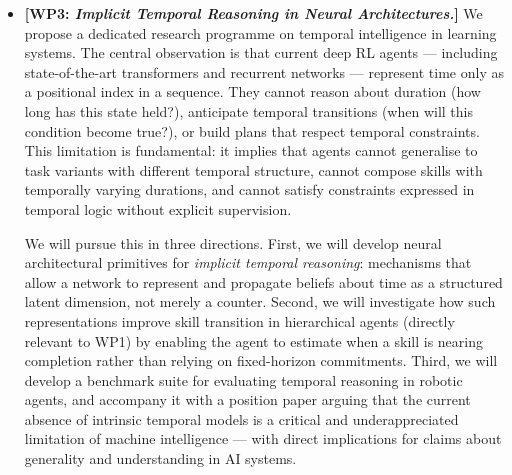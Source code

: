 \documentclass[11pt,a4paper]{article}
\begin{document}
\begin{itemize}[leftmargin=1.5em, itemsep=6pt]
\item \textbf{[WP3: \textit{Implicit Temporal Reasoning in Neural Architectures.}]}
  We propose a dedicated research programme on temporal intelligence in learning systems.
  The central observation is that current deep RL agents --- including state-of-the-art
  transformers and recurrent networks --- represent time only as a positional index
  in a sequence.
  They cannot reason about duration (how long has this state held?), anticipate
  temporal transitions (when will this condition become true?), or build plans that
  respect temporal constraints.
  This limitation is fundamental: it implies that agents cannot generalise to task
  variants with different temporal structure, cannot compose skills with temporally
  varying durations, and cannot satisfy constraints expressed in temporal logic
  without explicit supervision.

  We will pursue this in three directions.
  First, we will develop neural architectural primitives for \emph{implicit temporal
  reasoning}: mechanisms that allow a network to represent and propagate beliefs about
  time as a structured latent dimension, not merely a counter.
  Second, we will investigate how such representations improve skill transition in
  hierarchical agents (directly relevant to WP1) by enabling the agent to estimate
  when a skill is nearing completion rather than relying on fixed-horizon commitments.
  Third, we will develop a benchmark suite for evaluating temporal reasoning in robotic
  agents, and accompany it with a position paper arguing that the current absence of
  intrinsic temporal models is a critical and underappreciated limitation of machine
  intelligence --- with direct implications for claims about generality and understanding
  in AI systems.


\end{itemize}
\end{document}
